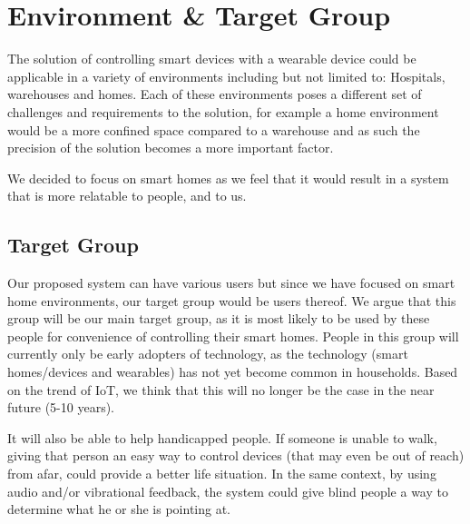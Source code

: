 \section{Environment \& Target Group}\label{sec:environment}

The solution of controlling smart devices with a wearable device could be applicable in a variety of environments including but not limited to: Hospitals, warehouses and homes.
Each of these environments poses a different set of challenges and requirements to the solution, for example a home environment would be a more confined space compared to a warehouse and as such the precision of the solution becomes a more important factor.

We decided to focus on smart homes as we feel that it would result in a system that is more relatable to people, and to us.

\subsection{Target Group}
Our proposed system can have various users but since we have focused on smart home environments, 
our target group would be users thereof. 
We argue that this group will be our main target group, 
as it is most likely to be used by these people for convenience of controlling their smart homes. 
People in this group will currently only be early adopters of technology, 
as the technology (smart homes/devices and wearables) has not yet become common in households.
Based on the trend of IoT, we think that this will no longer be the case in the near future (5-10 years). 

It will also be able to help handicapped people. 
If someone is unable to walk, 
giving that person an easy way to control devices (that may even be out of reach) from afar, 
could provide a better life situation. 
In the same context, by using audio and/or vibrational feedback, 
the system could give blind people a way to determine what he or she is pointing at. 
